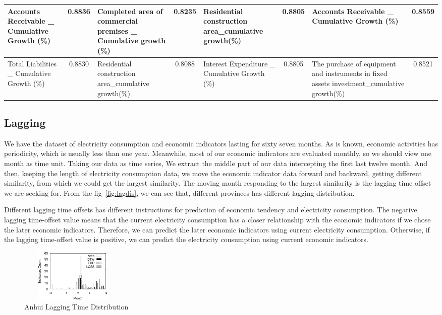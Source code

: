 \begin{table}
\begin{tabular}{|p{3cm}|c|p{3cm}|c|p{3cm}|c|p{3cm}|c|}
	Accounts Receivable \_ Cumulative Growth (\%)& 0.8836& Completed area of commercial premises \_ Cumulative growth (\%) & 0.8235&Residential construction area\_cumulative growth(\%) & 0.8805 &Accounts Receivable \_ Cumulative Growth (\%)& 0.8559\\ \hline
	Total Liabilities \_ Cumulative Growth (\%)& 0.8830 & Residential construction area\_cumulative growth(\%)&0.8088 & Interest Expenditure \_ Cumulative Growth (\%)&0.8805 & The purchase of equipment and instruments in fixed assets investment\_cumulative growth(\%) & 0.8521\\ \hline
\end{tabular}
\end{table}

\subsection{Lagging}
We have the dataset of electricity consumption and economic indicators lasting for sixty seven months. As is known, economic activities has 
periodicity, which is usually less than one year. Meanwhile, most of our economic indicators are evaluated monthly, so we should view one month as time unit. Taking our data as time series, We extract the middle part of our data intercepting the first last twelve month. And then, keeping the length of electricity consumption data, we move the economic indicator data forward and backward, getting different similarity, from which we could get the largest similarity. The moving month responding to the largest similarity is the lagging time offset we are seeking for. From the fig~\ref{fig:lagdis}, we can see that, different provinces has different lagging distribution.
 
Different lagging time offsets has different instructions for prediction of economic tendency and electricity consumption. The negative lagging time-offset value means that the current electricity consumption has a closer relationship with the economic indicators if we chose the later economic indicators. Therefore, we can predict the later economic indicators using current electricity consumption. Otherwise, if the lagging time-offset value is positive, we can predict the electricity consumption using current economic indicators.   
\begin{figure}
	\centering
	\includegraphics[height=1in, width=2in]{anhui_lag_dis}
	\caption{Anhui Lagging Time Distribution}
	\label{fig:anhui_lag}
\end{figure}

